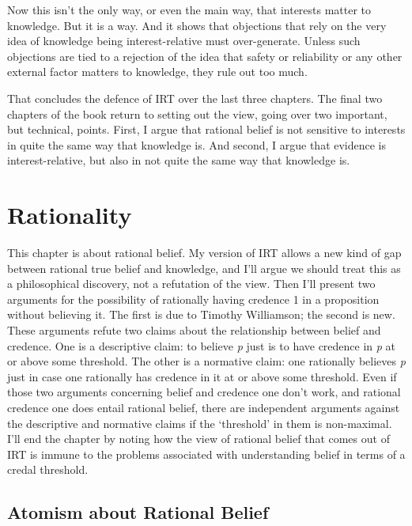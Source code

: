 \documentclass[
  12pt,
  letterpaper,
]{scrbook}
\begin{document}
Now this isn't the only way, or even the main way, that interests matter
to knowledge. But it is a way. And it shows that objections that rely on
the very idea of knowledge being interest-relative must over-generate.
Unless such objections are tied to a rejection of the idea that safety
or reliability or any other external factor matters to knowledge, they
rule out too much.

That concludes the defence of IRT over the last three chapters. The
final two chapters of the book return to setting out the view, going
over two important, but technical, points. First, I argue that rational
belief is not sensitive to interests in quite the same way that
knowledge is. And second, I argue that evidence is interest-relative,
but also in not quite the same way that knowledge is.


\chapter{Rationality}\label{sec-ratbel}

This chapter is about rational belief. My version of IRT allows a new
kind of gap between rational true belief and knowledge, and I'll argue
we should treat this as a philosophical discovery, not a refutation of
the view. Then I'll present two arguments for the possibility of
rationally having credence 1 in a proposition without believing it. The
first is due to Timothy Williamson; the second is new. These arguments
refute two claims about the relationship between belief and credence.
One is a descriptive claim: to believe \emph{p} just is to have credence
in \emph{p} at or above some threshold. The other is a normative claim:
one rationally believes \emph{p} just in case one rationally has
credence in it at or above some threshold. Even if those two arguments
concerning belief and credence one don't work, and rational credence one
does entail rational belief, there are independent arguments against the
descriptive and normative claims if the `threshold' in them is
non-maximal. I'll end the chapter by noting how the view of rational
belief that comes out of IRT is immune to the problems associated with
understanding belief in terms of a credal threshold.

\section{Atomism about Rational Belief}\label{sec-atomism}
\end{document}
